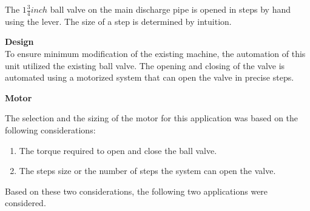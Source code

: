 \par
The $1 \frac{3}{4} inch $ ball valve on the main discharge pipe is opened in steps by hand using the lever. The size of a step is determined by intuition.
\par
\textbf{Design}\\
To ensure minimum modification of the existing machine, the automation of this unit utilized the existing ball valve. The opening and closing of the valve is automated using a motorized system that can open the valve in precise steps.
\par
\textbf{Motor}
\par
The selection and the sizing of the motor for this application was based on the following considerations:

\begin{enumerate}
    \item The torque required to open and close the ball valve.
    \item The steps size or the number of steps the system can open the valve.
\end{enumerate}
\par
Based on these two considerations, the following two applications were considered.
